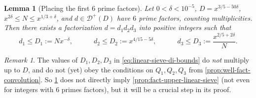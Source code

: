 \documentclass[reqno,11pt]{amsart}
\newtheorem{lemma}[theorem]{Lemma}
\theoremstyle{remark}
\newtheorem*{remark}{Remark}
\numberwithin{equation}{section}
\newcommand{\mD}{\mathcal{D}}
\begin{document}
\begin{lemma}[Placing the first 6 prime factors] \label{lem:placing-first-6}
Let $0 < \delta < 10^{-5}$, $D = x^{3/5 - 50\delta}$, $x^{2\delta} \le N \le x^{1/3 + \delta}$, and $d \in \mD^+(D)$ have $6$ prime factors, counting multiplicities. Then there exists a factorization $d = d_1 d_2 d_3$ into positive integers such that
\begin{equation} \label{eq:linear-sieve-di-bounds}
    d_1 \le D_1 := N x^{-\delta}, \qquad\quad 
    d_2 \le D_2 := x^{4/15 - 5\delta}, \qquad\quad 
    d_3 \le D_3 := \frac{x^{2/5 + 2\delta}}{N}.
\end{equation}
\end{lemma}

\begin{remark}
The values of $D_1, D_2, D_3$ in \cref{eq:linear-sieve-di-bounds} do \emph{not} multiply up to $D$, and do not (yet) obey the conditions on $Q_1, Q_2, Q_3$ from \cref{prop:well-fact-convolution}. So \cref{lem:placing-first-6} does not directly imply \cref{prop:fact-upper-linear-sieve} (not even for integers with $6$ primes factors), but it will be a crucial step in its proof.
\end{remark}
\end{document}
